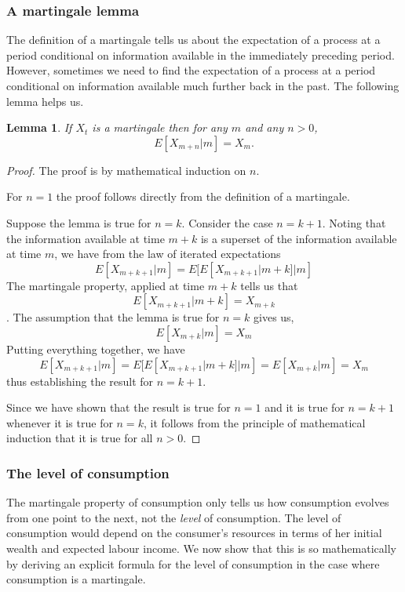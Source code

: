 \documentclass[12pt,reqno]{amsart}
\newtheorem{lem}{Lemma}
\begin{document}
\subsubsection{A martingale lemma}
The definition of a martingale tells us about the expectation of a
process at a period conditional on information available in the
immediately preceding period. However, sometimes we need to find the
expectation of a process at a period conditional on information
available much further back in the past. The following lemma helps us.
\begin{lem}\label{lem:martingale-mp}
If $X_t$ is a martingale then for any $m$ and any $n>0$,
\[E[X_{m+n}|m]=X_m.\]
\end{lem}
\begin{proof}
The proof is by mathematical induction on $n$.

For $n=1$ the proof follows directly from the definition of a martingale.

Suppose the lemma is true for $n=k$. Consider the case $n=k+1$.
Noting that the information available at time $m+k$ is a superset of
the information available at time $m$, we have from the law of
iterated expectations
\[E[X_{m+k+1}|m]=E[E[X_{m+k+1}|m+k]|m]\]
The martingale property, applied at time $m+k$ tells us that
\[E[X_{m+k+1}|m+k]=X_{m+k}\]. 
The assumption that the lemma is true for $n=k$ gives us,
\[E[X_{m+k}|m]=X_m\]
Putting everything together, we have
\[E[X_{m+k+1}|m]=E[E[X_{m+k+1}|m+k]|m]=E[X_{m+k}|m]=X_m\]
thus establishing the result for $n=k+1$.

Since we have shown that the result is true for $n=1$ and it is true
for $n=k+1$ whenever it is true for $n=k$, it follows from the
principle of mathematical induction that it is true for all $n>0$.
\end{proof}


\subsubsection{The level of consumption}
The martingale property of consumption only tells us how consumption evolves from one
point to the next, not the \emph{level} of consumption. The level of
consumption would depend on the consumer's resources in terms of her
initial wealth and expected labour income. We now show that this is so
mathematically by deriving an explicit formula for the level of
consumption in the case where consumption is a martingale.
\end{document}
